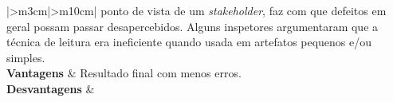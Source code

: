 \begin{longtable}{{|>{\centering\arraybackslash}m{3cm}|>{\centering\arraybackslash}m{10cm}|}}
ponto de vista de um \textit{stakeholder}, faz com que defeitos em geral possam passar
desapercebidos. Alguns inspetores argumentaram que a técnica de leitura era
ineficiente quando usada em artefatos pequenos e/ou simples. \\ \hline \textbf{Vantagens}                                          & Resultado final com menos erros.                                                                                                                                                                                                                                                                                                                                                                                                                                                                                                                                                                                                                                                                                                                                                             \\ \hline \textbf{Desvantagens}                                       &                                                                                                                                                                                                                                                                                                                                                                                                                                                                                                                                                                                                                                                                                                                                                                                              \\ \hline

\end{longtable}


